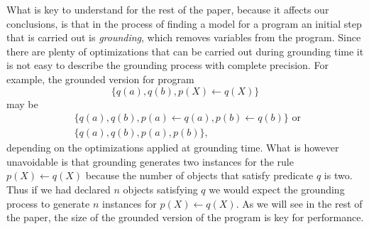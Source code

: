 What is key to understand for the rest of the paper, because it affects our conclusions, is that in the process of finding a model for a program an initial step that is carried out is \emph{grounding}, which removes variables from the program. Since there are plenty of optimizations that can be carried out during grounding time it is not easy to describe the grounding process with complete precision. For example, the grounded version for program
\begin{equation}
    \{q(a),q(b),p(X)\leftarrow q(X)\}
\end{equation} may be
\begin{align*}
&\{q(a),q(b),p(a)\leftarrow q(a),p(b)\leftarrow q(b)\} \text{ or } \\
&\{q(a),q(b),p(a),p(b)\},
\end{align*}
depending on the optimizations applied at grounding time. What is however unavoidable is that grounding generates two instances for the rule $p(X)\leftarrow q(X)$ because the number of objects that satisfy predicate $q$ is two. Thus if we had declared $n$ objects satisfying $q$ we would expect the grounding process to generate $n$ instances for $p(X)\leftarrow q(X)$. As we will see in the rest of the paper, the size of the grounded version of the program is key for performance.
